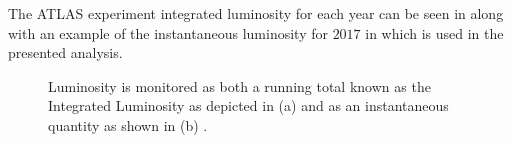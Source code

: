 The ATLAS experiment integrated luminosity for each year can be seen in
 along with an example of the instantaneous luminosity
for $2017$ in  which is used in the presented analysis.

\begin{figure}[!htbp] 
\centering
{}\hfill
{}\hfill
\caption{Luminosity is monitored as both a running total known as the
Integrated Luminosity as depicted in (a) and as an instantaneous quantity as
shown in (b) \cite{LuminosityPublicResultsRun2}.}
\label{fig:luminosity} 
\end{figure}

